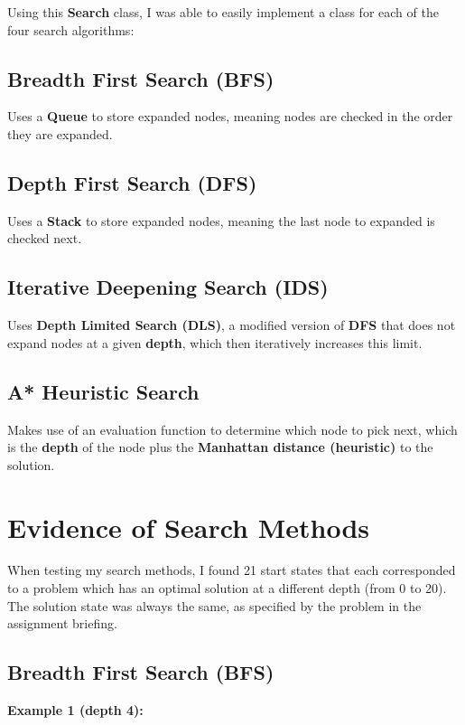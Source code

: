 \documentclass{article}
\begin{document}
	Using this \textbf{Search} class, I was able to easily implement a class for each of the four search algorithms:
	
	\subsection{Breadth First Search (BFS)}
	Uses a \textbf{Queue} to store expanded nodes, meaning nodes are checked in the order they are expanded.
	
	\subsection{Depth First Search (DFS)}
	Uses a \textbf{Stack} to store expanded nodes, meaning the last node to expanded is checked next.
	
	\subsection{Iterative Deepening Search (IDS)}
	Uses \textbf{Depth Limited Search (DLS)}, a modified version of \textbf{DFS} that does not expand nodes at a given \textbf{depth}, which then iteratively increases this limit. 
	
	\subsection{A* Heuristic Search}
	Makes use of an evaluation function to determine which node to pick next, which is the \textbf{depth} of the node plus the \textbf{Manhattan distance (heuristic)} to the solution.
	
	\section{Evidence of Search Methods}
	When testing my search methods, I found 21 start states that each corresponded to a problem which has an optimal solution at a different depth (from 0 to 20). The solution state was always the same, as specified by the problem in the assignment briefing.
	
	\subsection{Breadth First Search (BFS)}
	\textbf{Example 1 (depth 4):}
	
\end{document}

